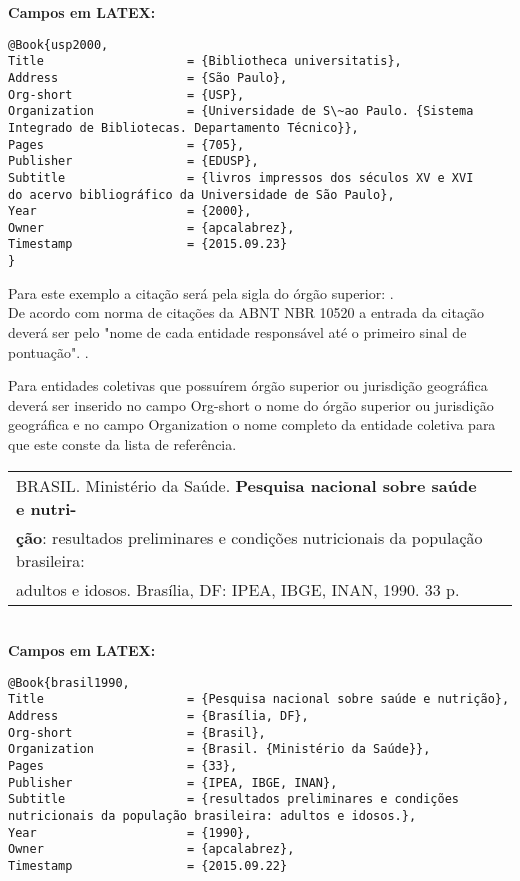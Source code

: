 \textbf{Campos em LATEX:}

\begin{verbatim}
@Book{usp2000,
Title                    = {Bibliotheca universitatis},
Address                  = {São Paulo},
Org-short                = {USP},
Organization             = {Universidade de S\~ao Paulo. {Sistema 
Integrado de Bibliotecas. Departamento Técnico}},
Pages                    = {705},
Publisher                = {EDUSP},
Subtitle                 = {livros impressos dos séculos XV e XVI 
do acervo bibliográfico da Universidade de São Paulo},
Year                     = {2000},
Owner                    = {apcalabrez},
Timestamp                = {2015.09.23}
}
\end{verbatim}

Para este exemplo a citação será pela sigla do órgão superior: \cite{usp200}. \\

De acordo com norma de citações da ABNT NBR 10520 a entrada da citação deverá ser pelo "nome de cada entidade responsável até o primeiro sinal de pontuação". \cite{nbr10520}. 

Para entidades coletivas que possuírem órgão superior ou jurisdição geográfica deverá ser inserido no campo Org-short o nome do órgão superior  ou jurisdição geográfica e no campo Organization o nome completo da entidade coletiva para que este conste da lista de referência. \\

\begin{tabular}{|l|c|} \hline
BRASIL. Ministério da Saúde. \textbf{Pesquisa nacional sobre saúde e nutri-} \\ \textbf{ção}: resultados preliminares e condições nutricionais da população brasileira: \\ adultos e idosos. Brasília, DF: IPEA, IBGE, INAN, 1990. 33 p.   \\\hline
\end{tabular}\\

\textbf{Campos em LATEX:}

\begin{verbatim}
@Book{brasil1990,
Title                    = {Pesquisa nacional sobre saúde e nutrição},
Address                  = {Brasília, DF},
Org-short                = {Brasil},
Organization             = {Brasil. {Ministério da Saúde}},
Pages                    = {33},
Publisher                = {IPEA, IBGE, INAN},
Subtitle                 = {resultados preliminares e condições 
nutricionais da população brasileira: adultos e idosos.},
Year                     = {1990},
Owner                    = {apcalabrez},
Timestamp                = {2015.09.22}
\end{verbatim}

